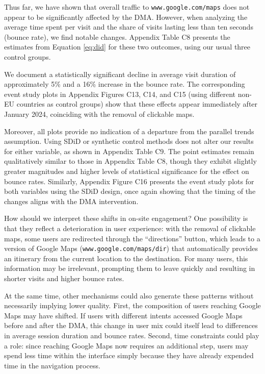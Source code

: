 \documentclass[11pt]{article}
\begin{document}
	Thus far, we have shown that overall traffic to \texttt{www.google.com/maps} does not appear to be significantly affected by the DMA. However, when analyzing the average time spent per visit and the share of visits lasting less than ten seconds (bounce rate), we find notable changes. Appendix Table C8 presents the estimates from Equation \ref{eq:did} for these two outcomes, using our usual three control groups. 
	
	We document a statistically significant decline in average visit duration of approximately 5\% and a 16\% increase in the bounce rate. The corresponding event study plots in Appendix Figures C13, C14, and C15 (using different non-EU countries as control groups) show that these effects appear immediately after January 2024, coinciding with the removal of clickable maps.
	
	Moreover, all plots provide no indication of a departure from the parallel trends assumption. Using SDiD or synthetic control methods does not alter our results for either variable, as shown in Appendix Table C9. The point estimates remain qualitatively similar to those in Appendix Table C8, though they exhibit slightly greater magnitudes and higher levels of statistical significance for the effect on bounce rates. Similarly, Appendix Figure C16 presents the event study plots for both variables using the SDiD design, once again showing that the timing of the changes aligns with the DMA intervention.  
	
	How should we interpret these shifts in on-site engagement? One possibility is that they reflect a deterioration in user experience: with the removal of clickable maps, some users are redirected through the ``directions'' button, which leads to a version of Google Maps (\texttt{www.google.com/maps/dir}) that automatically provides an itinerary from the current location to the destination. For many users, this information may be irrelevant, prompting them to leave quickly and resulting in shorter visits and higher bounce rates.  
	
	
	At the same time, other mechanisms could also generate these patterns without necessarily implying lower quality. First, the composition of users reaching Google Maps may have shifted. If users with different intents accessed Google Maps before and after the DMA, this change in user mix could itself lead to differences in average session duration and bounce rates. Second, time constraints could play a role: since reaching Google Maps now requires an additional step, users may spend less time within the interface simply because they have already expended time in the navigation process.  
	
\end{document}
